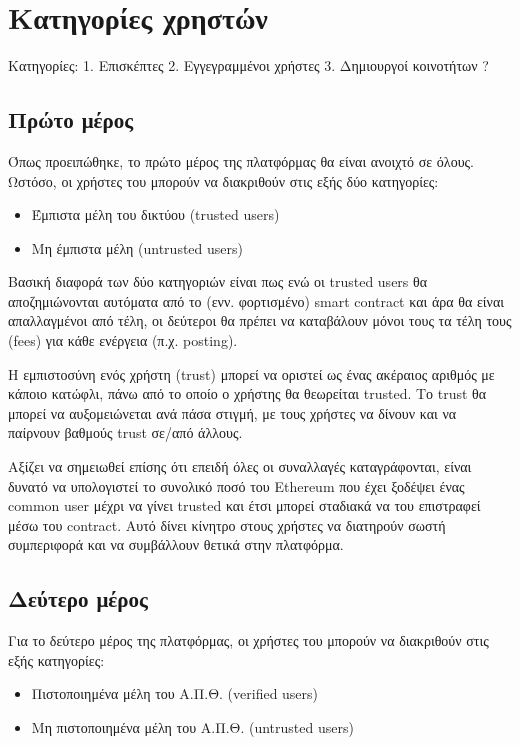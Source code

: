 \section{Κατηγορίες χρηστών} \label{section:3-2-user-categories}

Κατηγορίες:
1. Επισκέπτες
2. Εγγεγραμμένοι χρήστες
3. Δημιουργοί κοινοτήτων ?

\subsection{Πρώτο μέρος} \label{subsection:4-4-first-part}

Όπως προειπώθηκε, το πρώτο μέρος της πλατφόρμας θα είναι ανοιχτό σε όλους. Ωστόσο, οι χρήστες του μπορούν να διακριθούν
στις εξής δύο κατηγορίες:

\begin{itemize}
    \item Έμπιστα μέλη του δικτύου (trusted users)
    \item Μη έμπιστα μέλη  (untrusted users)
\end{itemize}

Βασική διαφορά των δύο κατηγοριών είναι πως ενώ οι trusted users θα αποζημιώνονται αυτόματα από το (ενν. φορτισμένο)
smart contract και άρα θα είναι απαλλαγμένοι από τέλη, οι δεύτεροι θα πρέπει να καταβάλουν μόνοι τους τα τέλη τους
(fees) για κάθε ενέργεια (π.χ. posting).

Η εμπιστοσύνη ενός χρήστη (trust) μπορεί να οριστεί ως ένας ακέραιος αριθμός με κάποιο κατώφλι, πάνω από το οποίο ο
χρήστης θα θεωρείται trusted. Το trust θα μπορεί να αυξομειώνεται ανά πάσα στιγμή, με τους χρήστες να δίνουν και να
παίρνουν βαθμούς trust σε/από άλλους.

Αξίζει να σημειωθεί επίσης ότι επειδή όλες οι συναλλαγές καταγράφονται, είναι δυνατό να υπολογιστεί το συνολικό ποσό του
Ethereum που έχει ξοδέψει ένας common user μέχρι να γίνει trusted και έτσι μπορεί σταδιακά να του επιστραφεί μέσω του
contract. Αυτό δίνει κίνητρο στους χρήστες να διατηρούν σωστή συμπεριφορά και να συμβάλλουν θετικά στην πλατφόρμα.

\subsection{Δεύτερο μέρος}

Για το δεύτερο μέρος της πλατφόρμας, οι χρήστες του μπορούν να διακριθούν στις εξής κατηγορίες: 

\begin{itemize}
    \item Πιστοποιημένα μέλη του Α.Π.Θ. (verified users)
    \item Μη πιστοποιημένα μέλη του Α.Π.Θ. (untrusted users)
\end{itemize}

